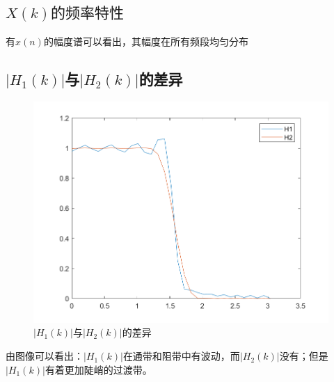 \documentclass{../source/zjureport}
\begin{document}
        \subsection{$X(k)的频率特性$}
        有$x(n)$的幅度谱可以看出，其幅度在所有频段均匀分布

        \subsection{$|H_1(k)|$与$|H_2(k)|$的差异}
        \begin{figure}[H]
            \centering
            \includegraphics[scale = 0.7]{figure/频响区别.png}
            \caption{$|H_1(k)|$与$|H_2(k)|$的差异}
        \end{figure}
        由图像可以看出：$|H_1(k)|$在通带和阻带中有波动，而$|H_2(k)|$没有；但是$|H_1(k)|$有着更加陡峭的过渡带。
\end{document}

